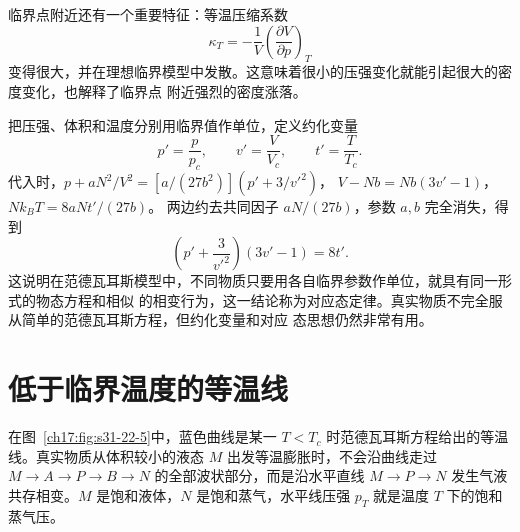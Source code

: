 {\par\noindent\begin{minipage}{\linewidth}
\criticalApparatusFigure
{}\label{ch17:fig:s31-22-4}
\end{minipage}\par\medskip

临界点附近还有一个重要特征：等温压缩系数
\[
  \kappa_T=-\frac1V\left(\frac{\partial V}{\partial p}\right)_T
\]
变得很大，并在理想临界模型中发散。这意味着很小的压强变化就能引起很大的密度变化，也解释了临界点
附近强烈的密度涨落。

把压强、体积和温度分别用临界值作单位，定义约化变量
\begin{equation}
  \boxed{p'=\frac{p}{p_c},\qquad v'=\frac{V}{V_c},\qquad t'=\frac{T}{T_c}}.
  \label{ch17:eq:s31-22-4}
\end{equation}
代入时，$p+aN^2/V^2=[a/(27b^2)](p'+3/v'^2)$，
$V-Nb=Nb(3v'-1)$，$Nk_BT=8aNt'/(27b)$。
两边约去共同因子 $aN/(27b)$，参数 $a,b$ 完全消失，得到
\begin{equation}
  \boxed{\left(p'+\frac{3}{v'^2}\right)(3v'-1)=8t'}.
  \label{ch17:eq:s31-22-5}
\end{equation}
这说明在范德瓦耳斯模型中，不同物质只要用各自临界参数作单位，就具有同一形式的物态方程和相似
的相变行为，这一结论称为对应态定律。真实物质不完全服从简单的范德瓦耳斯方程，但约化变量和对应
态思想仍然非常有用。

\section{低于临界温度的等温线}

在图~\ref{ch17:fig:s31-22-5}中，蓝色曲线是某一 $T<T_c$ 时范德瓦耳斯方程给出的等温线。真实物质从体积较小的液态
$M$ 出发等温膨胀时，不会沿曲线走过 $M\to A\to P\to B\to N$ 的全部波状部分，而是沿水平直线
$M\to P\to N$ 发生气液共存相变。$M$ 是饱和液体，$N$ 是饱和蒸气，水平线压强 $p_T$ 就是温度 $T$
下的饱和蒸气压。

\par\noindent\begin{minipage}{\linewidth}
\maxwellAreaFigure
{}\label{ch17:fig:s31-22-5}
\end{minipage}\par\medskip

}
